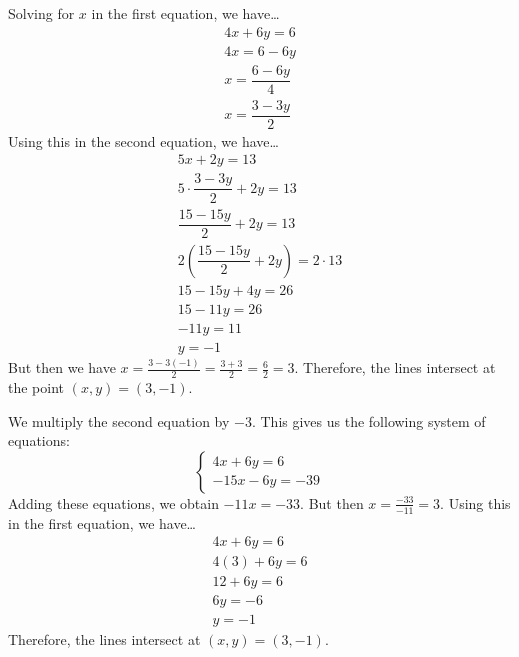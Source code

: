 \documentclass[11pt,letterpaper]{article}
\begin{document}
 Solving for $x$ in the first equation, we have\dots
	\[
	\begin{aligned}
	4x + 6y= 6 \\
	4x= 6 - 6y \\
	x= \dfrac{6 - 6y}{4} \\
	x= \dfrac{3 - 3y}{2}
	\end{aligned}
	\] 
Using this in the second equation, we have\dots
	\[
	\begin{gathered}
	5x + 2y= 13 \\
	5 \cdot \dfrac{3 - 3y}{2} + 2y= 13 \\
	\dfrac{15 - 15y}{2} + 2y= 13 \\
	2 \left( \dfrac{15 - 15y}{2} + 2y \right)= 2 \cdot 13 \\
	15 - 15y + 4y= 26 \\
	15 - 11y= 26 \\
	-11y= 11 \\
	y= -1
	\end{gathered}
	\]
But then we have $x= \frac{3 - 3(-1)}{2}= \frac{3 + 3}{2}= \frac{6}{2}= 3$. Therefore, the lines intersect at the point $(x, y)= (3, -1)$. \pspace

 We multiply the second equation by $-3$. This gives us the following system of equations:
	\[
	\begin{cases}
	4x + 6y= 6 \\
	-15x - 6y= -39
	\end{cases}
	\]
Adding these equations, we obtain $-11x= -33$. But then $x= \frac{-33}{-11}= 3$. Using this in the first equation, we have\dots
	\[
	\begin{gathered}
	4x + 6y= 6 \\
	4(3) + 6y= 6 \\
	12 + 6y= 6 \\
	6y= -6 \\
	y= -1
	\end{gathered}
	\]
Therefore, the lines intersect at $(x, y)= (3, -1)$. 
\end{document}
